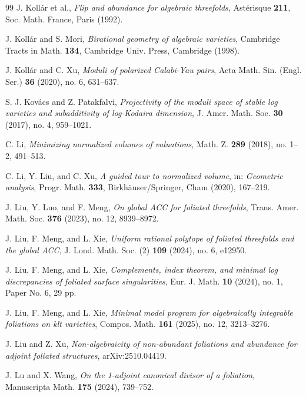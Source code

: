 \documentclass[11pt,reqno]{amsart}
\numberwithin{equation}{section}
\theoremstyle{definition}
\begin{document}
\begin{thebibliography}{99}
 J. Koll\'{a}r et al., \textit{Flip and abundance for algebraic threefolds}, Ast\'{e}risque \textbf{211}, Soc. Math. France, Paris (1992).

 J. Koll\'{a}r and S. Mori, \textit{Birational geometry of algebraic varieties}, Cambridge Tracts in Math. \textbf{134}, Cambridge Univ. Press, Cambridge (1998).

 J. Koll\'ar and C. Xu, \textit{Moduli of polarized Calabi-Yau pairs}, Acta Math. Sin. (Engl. Ser.) \textbf{36} (2020), no. 6, 631--637.

 S. J. Kov\'acs and Z. Patakfalvi, \textit{Projectivity of the moduli space of stable log varieties and subadditivity of log-Kodaira dimension}, J. Amer. Math. Soc. \textbf{30} (2017), no. 4, 959--1021.

 C. Li, \textit{Minimizing normalized volumes of valuations}, Math. Z. \textbf{289} (2018), no. 1--2, 491--513.

 C. Li, Y. Liu, and C. Xu, \textit{A guided tour to normalized volume}, in: \textit{Geometric analysis}, Progr. Math. \textbf{333}, Birkh\"auser/Springer, Cham (2020), 167--219.

 J. Liu, Y. Luo, and F. Meng, \textit{On global ACC for foliated threefolds}, Trans. Amer. Math. Soc. \textbf{376} (2023), no. 12, 8939--8972.

 J. Liu, F. Meng, and L. Xie, \textit{Uniform rational polytope of foliated threefolds and the global ACC}, J. Lond. Math. Soc. (2) \textbf{109} (2024), no. 6, e12950.

 J. Liu, F. Meng, and L. Xie, \textit{Complements, index theorem, and minimal log discrepancies of foliated surface singularities}, Eur. J. Math. \textbf{10} (2024), no. 1, Paper No. 6, 29 pp.

 J. Liu, F. Meng, and L. Xie, \textit{Minimal model program for algebraically integrable foliations on klt varieties}, Compos. Math. \textbf{161} (2025), no. 12, 3213--3276.

 J. Liu and Z. Xu, \textit{Non-algebraicity of non-abundant foliations and abundance for adjoint foliated structures}, arXiv:2510.04419.

 J. Lu and X. Wang, \textit{On the 1-adjoint canonical divisor of a foliation}, Manuscripta Math. \textbf{175} (2024), 739--752.


\end{thebibliography}
\end{document}
